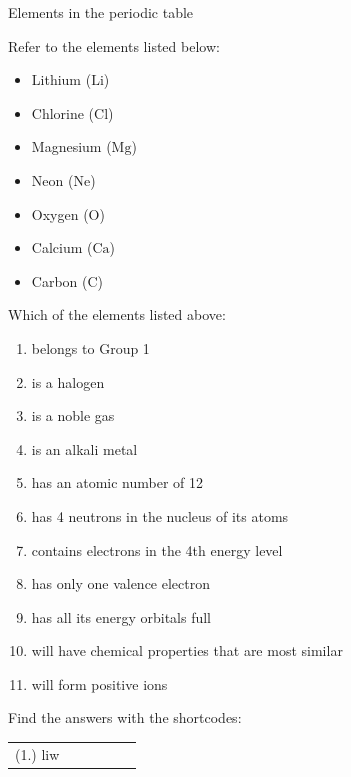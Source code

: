 \begin{exercises}{Elements in the periodic table}

            \nopagebreak
            \label{m38760*id262476}Refer to the elements listed below: \label{m38760*id7632}\begin{itemize}[noitemsep]
            \item Lithium ($\mathrm{Li}$)\item Chlorine ($\mathrm{Cl}$)\item Magnesium ($\mathrm{Mg}$)\item Neon ($\mathrm{Ne}$)\item Oxygen ($\mathrm{O}$)\item Calcium ($\mathrm{Ca}$)\item Carbon ($\mathrm{C}$)\end{itemize}
         Which of the elements listed above:
        \label{m38760*id262499}\begin{enumerate}[noitemsep, label=\textbf{\arabic*}. ] 
            \label{m38760*uid158}\item belongs to Group 1
\label{m38760*uid159}\item is a halogen
\label{m38760*uid160}\item is a noble gas
\label{m38760*uid161}\item is an alkali metal
\label{m38760*uid162}\item has an atomic number of 12
\label{m38760*uid163}\item has 4 neutrons in the nucleus of its atoms
\label{m38760*uid164}\item contains electrons in the 4th energy level
\label{m38760*uid165}\item has only one valence electron
\label{m38760*uid166}\item has all its energy orbitals full
\label{m38760*uid167}\item will have chemical properties that are most similar
\label{m38760*uid168}\item will form positive ions
\end{enumerate}
         \par 
\label{m38760**end}
\par {} Find the answers with the shortcodes:
 \par \begin{tabular}[h]{cccccc}
 (1.) liw  & \end{tabular}

\end{exercises}

